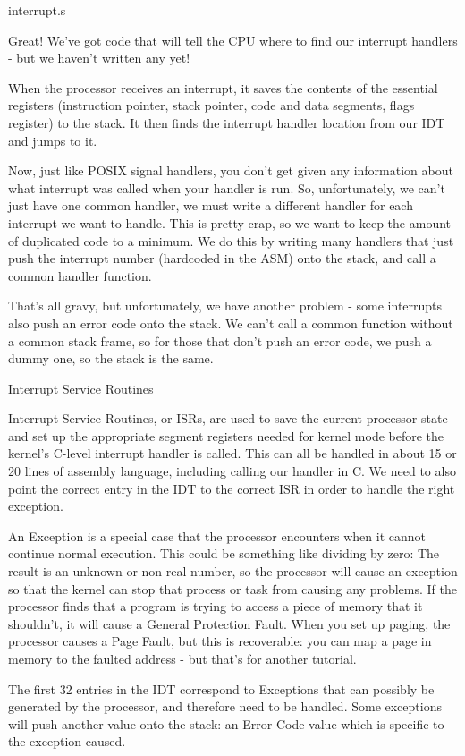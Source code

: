 \documentclass[11pt]{article}
\begin{document}
 interrupt.s

Great! We've got code that will tell the CPU where to find our interrupt handlers - but we haven't written any yet!

When the processor receives an interrupt, it saves the contents of the essential registers (instruction pointer, stack pointer, code and data segments, flags register) to the stack. It then finds the interrupt handler location from our IDT and jumps to it.

Now, just like POSIX signal handlers, you don't get given any information about what interrupt was called when your handler is run. So, unfortunately, we can't just have one common handler, we must write a different handler for each interrupt we want to handle. This is pretty crap, so we want to keep the amount of duplicated code to a minimum. We do this by writing many handlers that just push the interrupt number (hardcoded in the ASM) onto the stack, and call a common handler function.

That's all gravy, but unfortunately, we have another problem - some interrupts also push an error code onto the stack. We can't call a common function without a common stack frame, so for those that don't push an error code, we push a dummy one, so the stack is the same.

Interrupt Service Routines

Interrupt Service Routines, or ISRs, are used to save the current processor state and set up the appropriate segment registers needed for kernel mode before the kernel's C-level interrupt handler is called. This can all be handled in about 15 or 20 lines of assembly language, including calling our handler in C. We need to also point the correct entry in the IDT to the correct ISR in order to handle the right exception.

An Exception is a special case that the processor encounters when it cannot continue normal execution. This could be something like dividing by zero: The result is an unknown or non-real number, so the processor will cause an exception so that the kernel can stop that process or task from causing any problems. If the processor finds that a program is trying to access a piece of memory that it shouldn't, it will cause a General Protection Fault. When you set up paging, the processor causes a Page Fault, but this is recoverable: you can map a page in memory to the faulted address - but that's for another tutorial.

The first 32 entries in the IDT correspond to Exceptions that can possibly be generated by the processor, and therefore need to be handled. Some exceptions will push another value onto the stack: an Error Code value which is specific to the exception caused.
\end{document}
